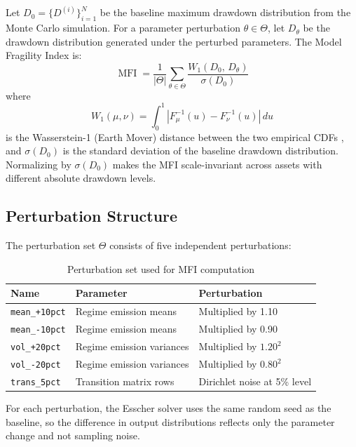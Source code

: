 \documentclass[12pt]{article}
\newcommand{\mfi}{\operatorname{MFI}}
\begin{document}
Let $D_0 = \{D^{(i)}\}_{i=1}^N$ be the baseline maximum drawdown distribution from the
Monte Carlo simulation. For a parameter perturbation $\theta \in \Theta$, let
$D_\theta$ be the drawdown distribution generated under the perturbed parameters.
The Model Fragility Index is:
\begin{equation}
  \mfi = \frac{1}{|\Theta|} \sum_{\theta \in \Theta}
    \frac{W_1(D_0,\, D_\theta)}{\sigma(D_0)}
  \label{eq:mfi}
\end{equation}
where
\begin{equation}
  W_1(\mu, \nu) = \int_0^1 |F_\mu^{-1}(u) - F_\nu^{-1}(u)|\, du
\end{equation}
is the Wasserstein-1 (Earth Mover) distance between the two empirical CDFs
\citep{villani2008}, and $\sigma(D_0)$ is the standard deviation of the baseline
drawdown distribution. Normalizing by $\sigma(D_0)$ makes the MFI scale-invariant
across assets with different absolute drawdown levels.

\subsection{Perturbation Structure}

The perturbation set $\Theta$ consists of five independent perturbations:

\begin{table}[h]
\centering
\caption{Perturbation set used for MFI computation}
\label{tab:perturbations}
\begin{tabular}{lll}
\toprule
Name & Parameter & Perturbation \\
\midrule
\texttt{mean\_+10pct} & Regime emission means & Multiplied by 1.10 \\
\texttt{mean\_-10pct} & Regime emission means & Multiplied by 0.90 \\
\texttt{vol\_+20pct}  & Regime emission variances & Multiplied by $1.20^2$ \\
\texttt{vol\_-20pct}  & Regime emission variances & Multiplied by $0.80^2$ \\
\texttt{trans\_5pct}  & Transition matrix rows & Dirichlet noise at 5\% level \\
\bottomrule
\end{tabular}
\end{table}

For each perturbation, the Esscher solver uses the same random seed as the baseline,
so the difference in output distributions reflects only the parameter change and not
sampling noise.
\end{document}
